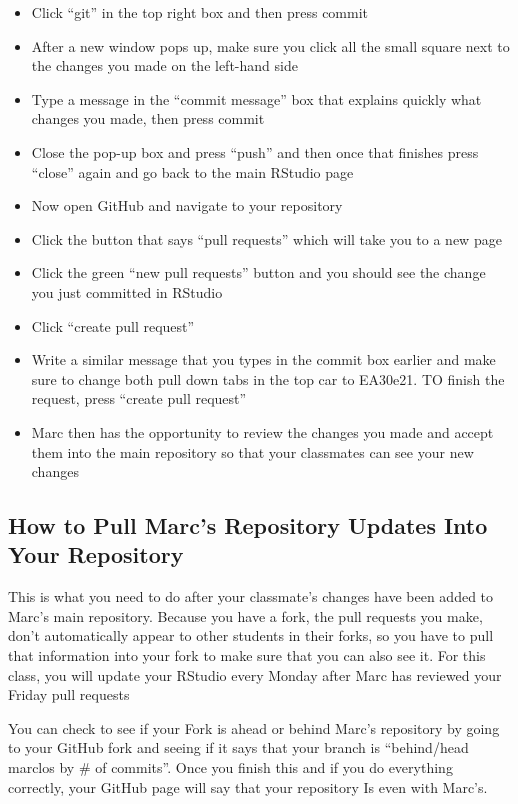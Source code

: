 \documentclass[12pt]{../SOP4_alpha}\usepackage[]{graphicx}\usepackage[]{color}
\begin{document}
\begin{itemize}

\item Click ``git'' in the top right box and then press commit
  \item After a new window pops up, make sure you click all the small square next to the changes you made on the left-hand side 
\item Type a message in the ``commit message'' box that explains quickly what changes you made, then press commit
  \item Close the pop-up box and press ``push'' and then once that finishes press ``close'' again and go back to the main RStudio page
\item Now open GitHub and navigate to your repository 
  \item Click the button that says ``pull requests'' which will take you to a new page
  \item Click the green ``new pull requests'' button and you should see the change you just committed in RStudio
  \item Click ``create pull request''
  \item Write a similar message that you types in the commit box earlier and make sure to change both pull down tabs in the top car to EA30e21. TO finish the request, press ``create pull request'' 
  \item Marc then has the opportunity to review the changes you made and accept them into the main repository so that your classmates can see your new changes

\end{itemize}


\subsection{How to Pull Marc's Repository Updates Into Your Repository}

This is what you need to do after your classmate's changes have been added to Marc's main repository. Because you have a fork, the pull requests you make, don't automatically appear to other students in their forks, so you have to pull that information into your fork to make sure that you can also see it. For this class, you will update your RStudio every Monday after Marc has reviewed your Friday pull requests

You can check to see if your Fork is ahead or behind Marc's repository by going to your GitHub fork and seeing if it says that your branch is ``behind/head marclos by \# of commits''. Once you finish this and if you do everything correctly, your GitHub page will say that your repository Is even with Marc's. 
\end{document}
